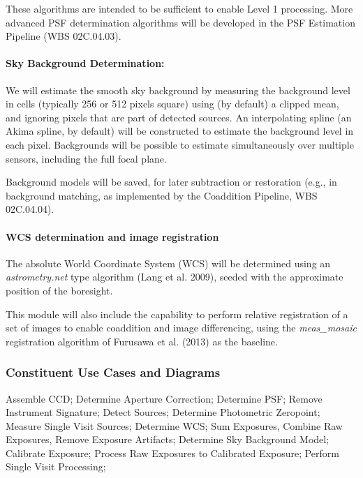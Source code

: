 \documentclass[12pt]{article}
\newcommand{\wbsPSF}{WBS 02C.04.03}
\newcommand{\wbsCoadd}{WBS 02C.04.04}
\begin{document}
These algorithms are intended to be sufficient to enable Level 1 processing. More advanced PSF determination algorithms will be developed in the PSF Estimation Pipeline (\wbsPSF).

\paragraph{Sky Background Determination:}

We will estimate the smooth sky background by measuring the background level in cells (typically 256 or 512 pixels square) %
using (by default) a clipped mean, and ignoring pixels that are part of detected sources.  An interpolating spline (an Akima spline, by default) will be constructed to estimate the background level in each pixel. Backgrounds will be possible to estimate simultaneously over multiple sensors, including the full focal plane.

Background models will be saved, for later subtraction or restoration (e.g., in background matching, as implemented by the Coaddition Pipeline, \wbsCoadd).

\paragraph{WCS determination and image registration}

The absolute World Coordinate System (WCS) will be determined using an {\em astrometry.net} type algorithm (Lang et al. 2009), seeded with the approximate position of the boresight.  %

This module will also include the capability to perform relative registration of a set of images to enable coaddition and image differencing, using the {\em meas\_mosaic} registration algorithm of Furusawa et al. (2013) as the baseline.

\subsubsection{Constituent Use Cases and Diagrams}

Assemble CCD; Determine Aperture Correction; Determine PSF; Remove Instrument Signature; Detect Sources; Determine Photometric Zeropoint; Measure Single Visit Sources; Determine WCS; Sum Exposures, Combine Raw Exposures, Remove Exposure Artifacts; Determine Sky Background Model; Calibrate Exposure; Process Raw Exposures to Calibrated Exposure; Perform Single Visit Processing; 
\end{document}
